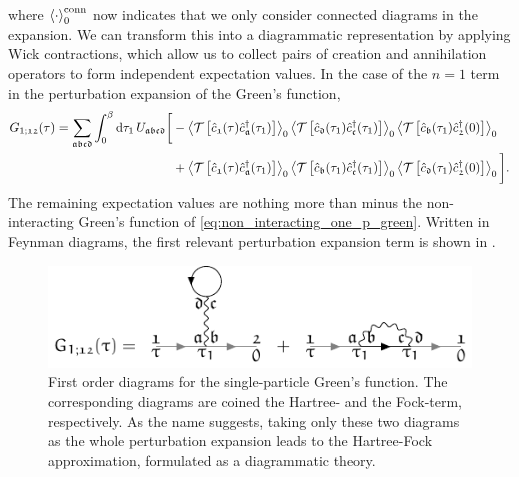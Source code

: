 \documentclass[../../main.tex]{subfiles}
\begin{document}
where $\left\langle \cdot\right\rangle_0^{\text{conn}}$ now indicates that we only consider connected diagrams in the expansion. We can transform this into a diagrammatic representation by applying Wick contractions, which allow us to collect pairs of creation and annihilation operators to form independent expectation values. In the case of the $n=1$ term in the perturbation expansion of the Green's function,
\begin{align}
\begin{split}
	G_{1;\mathfrak{12}}(\tau)=\sum_{\mathfrak{abcd}}\int_{0}^{\beta}\text{d}\tau_1\,U_{\mathfrak{abcd}}\bigg[&- \left\langle \mathcal{T}\left [\hat{c}_{\mathfrak{1}}(\tau)\hat{c}^{\dagger}_{\mathfrak{a}}(\tau_1)\right ]\right\rangle_0 \left\langle \mathcal{T}\left [\hat{c}_{\mathfrak{d}}(\tau_1)\hat{c}^{\dagger}_{\mathfrak{c}}(\tau_1)\right ]\right\rangle_0 \left\langle \mathcal{T}\left [\hat{c}_{\mathfrak{b}}(\tau_1)\hat{c}^{\dagger}_{\mathfrak{2}}(0)\right ]\right\rangle_0\\
	&+\left\langle \mathcal{T}\left [\hat{c}_{\mathfrak{1}}(\tau)\hat{c}^{\dagger}_{\mathfrak{a}}(\tau_1)\right ]\right\rangle_0 \left\langle \mathcal{T}\left [\hat{c}_{\mathfrak{b}}(\tau_1)\hat{c}^{\dagger}_{\mathfrak{c}}(\tau_1)\right ]\right\rangle_0 \left\langle \mathcal{T}\left [\hat{c}_{\mathfrak{d}}(\tau_1)\hat{c}^{\dagger}_{\mathfrak{2}}(0)\right ]\right\rangle_0\bigg].
\end{split}
\end{align}
The remaining expectation values are nothing more than minus the non-interacting Green's function of \eqref{eq:non_interacting_one_p_green}. Written in Feynman diagrams, the first relevant perturbation expansion term is shown in .
\begin{figure}[ht!]
	\centering
	\includegraphics[scale=1.2]{../../Graphics/Diagrams/one_p_green_first_perturbation_term/one_p_green_first_perturbation_term}
	\caption{First order diagrams for the single-particle Green's function. The corresponding diagrams are coined the Hartree- and the Fock-term, respectively. As the name suggests, taking only these two diagrams as the whole perturbation expansion leads to the Hartree-Fock approximation, formulated as a diagrammatic theory.}
	\label{fig:one_p_green_first_perturbation_term}
\end{figure}
\end{document}
